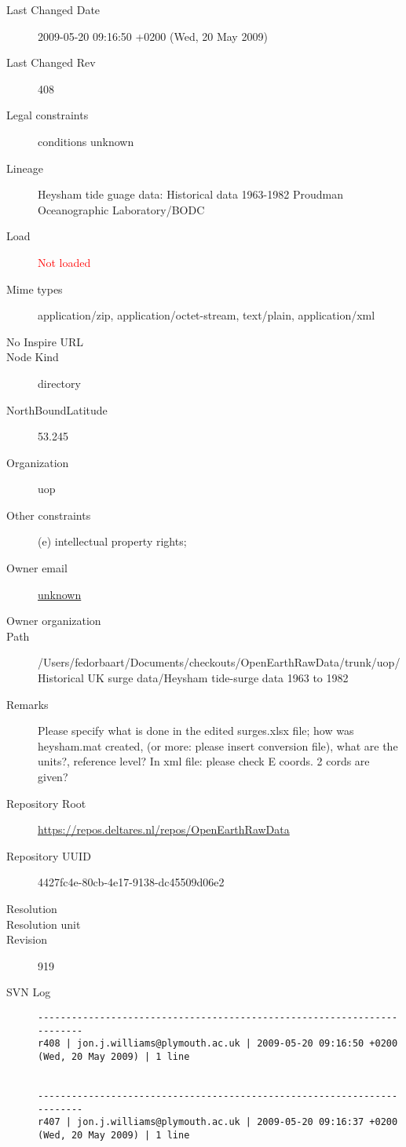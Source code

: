 \documentclass[9]{report}
\begin{document}
\begin{description}
  \item[Last Changed Date] 2009-05-20 09:16:50 +0200 (Wed, 20 May 2009)
  \item[Last Changed Rev] 408
  \item[Legal constraints] conditions unknown
  \item[Lineage] Heysham tide guage data: Historical data 1963-1982
Proudman Oceanographic Laboratory/BODC
  \item[Load] \textcolor{red}{Not loaded}
  \item[Mime types] application/zip, application/octet-stream, text/plain, application/xml
  \item[No Inspire URL] 
  \item[Node Kind] directory
  \item[NorthBoundLatitude] 53.245
  \item[Organization] uop
  \item[Other constraints] (e) intellectual property rights;
  \item[Owner email] \href{mailto:unknown}{unknown}
  \item[Owner organization] 
  \item[Path] /Users/fedorbaart/Documents/checkouts/OpenEarthRawData/trunk/uop/Historical UK surge data/Heysham tide-surge data 1963 to 1982
  \item[Remarks] Please specify what is done in the edited surges.xlsx file; how was heysham.mat created, (or more: please insert conversion file), what are the units?, reference level? In xml file: please check E coords. 2 cords are given?
  \item[Repository Root] \href{https://repos.deltares.nl/repos/OpenEarthRawData}{https://repos.deltares.nl/repos/OpenEarthRawData}
  \item[Repository UUID] 4427fc4e-80cb-4e17-9138-dc45509d06e2
  \item[Resolution] 
  \item[Resolution unit] 
  \item[Revision] 919
  \item[SVN Log] \begin{verbatim}
------------------------------------------------------------------------
r408 | jon.j.williams@plymouth.ac.uk | 2009-05-20 09:16:50 +0200 (Wed, 20 May 2009) | 1 line


------------------------------------------------------------------------
r407 | jon.j.williams@plymouth.ac.uk | 2009-05-20 09:16:37 +0200 (Wed, 20 May 2009) | 1 line



\end{verbatim}
\end{description}
\end{document}

